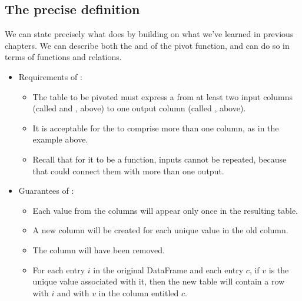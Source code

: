 \documentclass[letterpaper,10pt,english]{sphinxmanual}
\begin{document}
\subsection{The precise definition}
\label{\detokenize{chapter-6-single-table-verbs:the-precise-definition}}
We can state precisely what  does by building on what we’ve learned in previous chapters.  We can describe both the  and  of the pivot function, and can do so in terms of functions and relations.
\begin{itemize}
\item {} 
Requirements of :
\begin{itemize}
\item {} 
The table to be pivoted must express a  from at least two input columns (called  and , above) to one output column (called , above).

\item {} 
It is acceptable for the  to comprise more than one column, as in the example above.

\item {} 
Recall that for it to be a function, inputs cannot be repeated, because that could connect them with more than one output.

\end{itemize}

\item {} 
Guarantees of :
\begin{itemize}
\item {} 
Each value from the  columns will appear only once in the resulting table.

\item {} 
A new column will be created for each unique value in the old  column.

\item {} 
The  column will have been removed.

\item {} 
For each  entry \(i\) in the original DataFrame and each  entry \(c\), if \(v\) is the unique value associated with it, then the new table will contain a row with  \(i\) and with \(v\) in the column entitled \(c\).

\end{itemize}

\end{itemize}
\end{document}
